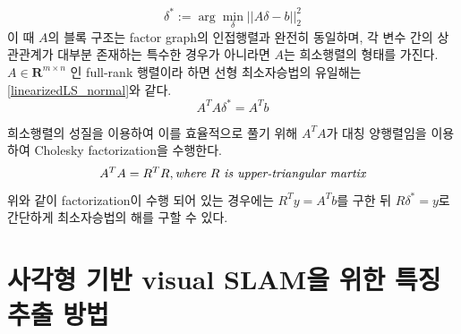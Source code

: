 \documentclass[master,korean,final]{cbnu-ecs}
\begin{document}
\begin{equation}
\label{linearizedLS_simple}
\delta^*:=\arg\min_\delta || A\delta - b ||^2_2
\end{equation}
이 때 $A$의 블록 구조는 factor graph의 인접행렬과 완전히 동일하며, 각 변수 간의 상관관계가 대부분 존재하는 특수한 경우가 아니라면 $A$는 희소행렬의 형태를 가진다.
$A \in \mathbf{R}^{m\times n}$ 인 full-rank 행렬이라 하면 선형 최소자승법의 유일해는 \eqref{linearizedLS_normal}와 같다.
\begin{equation}
\label{linearizedLS_normal}
A^T A\delta^*= A^T b
\end{equation}
 
희소행렬의 성질을 이용하여 이를 효율적으로 풀기 위해 $A^T A$가 대칭 양행렬임을 이용하여 Cholesky factorization을 수행한다.
\begin{equation}
\label{cholesky}
A^T A = R^T R, \emph{where}\ R\ \emph{is upper-triangular martix}
\end{equation}
위와 같이 factorization이 수행 되어 있는 경우에는 $R^T y=A^T b$를 구한 뒤 $R\delta^*=y$로 간단하게 최소자승법의 해를 구할 수 있다. 

\newpage
\chapter{사각형 기반 visual SLAM을 위한 특징 추출 방법}
\end{document}

